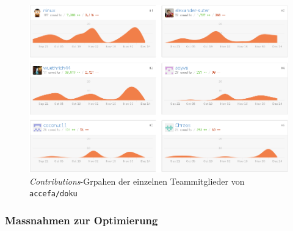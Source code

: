 \begin{figure}[h!]
	\centering
	\includegraphics[width=1\textwidth]{../../fig/pm/gh-contributions-team.png}
	\caption{\emph{Contributions}-Grpahen der einzelnen Teammitglieder
		von \lstinline{accefa/doku}}
	\label{fig:gh-contributions-team}
\end{figure}

\subsubsection{Massnahmen zur Optimierung}\label{sec:issue-optize}
